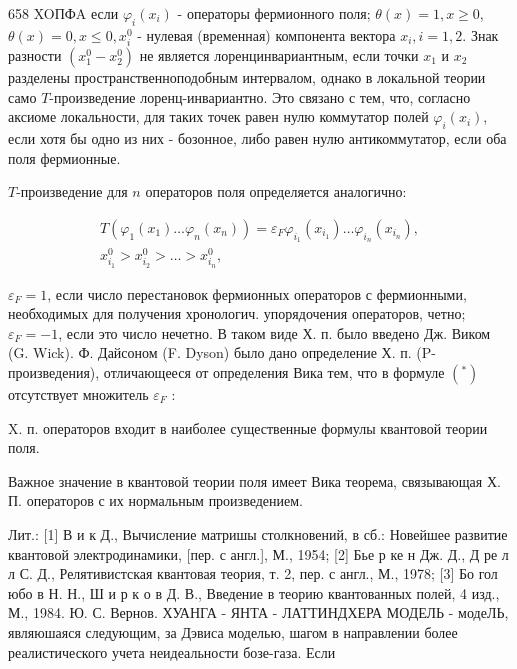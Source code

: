 \documentclass[10pt]{article}
\begin{document}
658 XOПФA если $\varphi_{i}\left(x_{i}\right)$ - операторы фермионного поля; $\theta(x)=1, x \geqslant 0$, $\theta(x)=0, x \leqslant 0, x_{i}^{0}$ - нулевая (временная) компонента вектора $x_{i}, i=1,2$. Знак разности $\left(x_{1}^{0}-x_{2}^{0}\right)$ не является лоренцинвариантным, если точки $x_{1}$ и $x_{2}$ разделены пространственноподобным интервалом, однако в локальной теории само $T$-произведение лоренц-инвариантно. Это связано с тем, что, согласно аксиоме локальности, для таких точек равен нулю коммутатор полей $\varphi_{i}\left(x_{i}\right)$, если хотя бы одно из них - бозонное, либо равен нулю антикоммутатор, если оба поля фермионные.



$T$-произведение для $n$ операторов поля определяется аналогично:



\[

\begin{gathered}

T\left(\varphi_{1}\left(x_{1}\right) \ldots \varphi_{n}\left(x_{n}\right)\right)=\varepsilon_{F} \varphi_{i_{1}}\left(x_{i_{1}}\right) \ldots \varphi_{i_{n}}\left(x_{i_{n}}\right), \\

x_{i_{1}}^{0}>x_{i_{2}}^{0}>\ldots>x_{i_{n}}^{0},

\end{gathered}

\]



$\varepsilon_{F}=1$, если число перестановок фермионных операторов с фермионными, необходимых для получения хронологич. упорядочения операторов, четно; $\varepsilon_{F}=-1$, если это число нечетно. В таком виде Х. п. было введено Дж. Виком (G. Wick). Ф. Дайсоном (F. Dyson) было дано определение Х. п. (P-произведения), отличающееся от определения Вика тем, что в формуле $\left({ }^{*}\right)$ отсутствует множитель $\varepsilon_{F}$ :



X. п. операторов входит в наиболее существенные формулы квантовой теории поля.



Важное значение в квантовой теории поля имеет Вика теорема, связывающая Х. П. операторов с их нормальным произведением.



Лит.: [1] В и к Д., Вычисление матришы столкновений, в сб.: Новейшее развитие квантовой электродинамики, [пер. с англ.], М., 1954; [2] Бье р ке н Дж. Д., Д ре л л С. Д., Релятивистская квантовая теория, т. 2, пер. с англ., М., 1978; [3] Бо гол юбо в Н. Н., Ш и р к о в Д. В., Введение в теорию квантованных полей, 4 изд., М., 1984. Ю. С. Вернов. ХУАНГА - ЯНТА - ЛАТТИНДХЕРА МОДЕЛЬ - модеЛЬ, являюшаяся следующим, за Дэвиса моделью, шагом в направлении более реалистического учета неидеальности бозе-газа. Если
\end{document}
